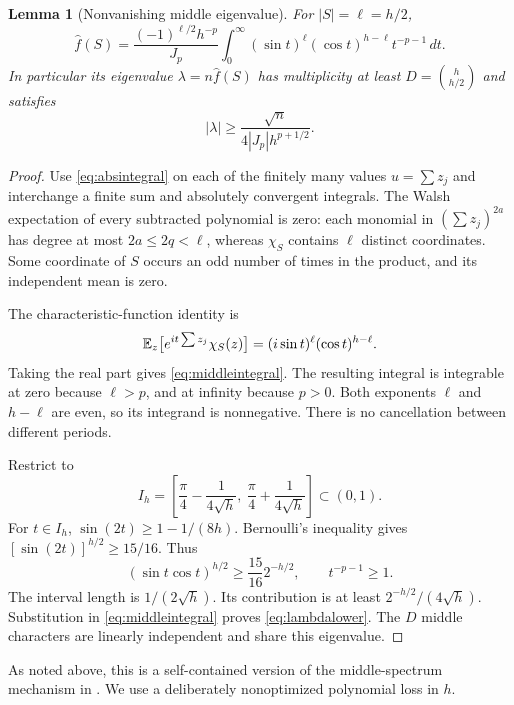 \documentclass[11pt]{article}
\newtheorem{lemma}[theorem]{Lemma}
\theoremstyle{remark}\newtheorem{remark}[theorem]{Remark}
\begin{document}
\begin{lemma}[Nonvanishing middle eigenvalue]\label{lem:middle}
For $|S|=\ell=h/2$,
\begin{equation}\label{eq:middleintegral}
 \widehat f(S)=\frac{(-1)^{\ell/2}h^{-p}}{J_p}
 \int_0^\infty(\sin t)^\ell(\cos t)^{h-\ell}t^{-p-1}\,dt.
\end{equation}
In particular its eigenvalue $\lambda=n\widehat f(S)$ has multiplicity at least
$D=\binom h{h/2}$ and satisfies
\begin{equation}\label{eq:lambdalower}
 |\lambda|\ge\frac{\sqrt n}{4|J_p|h^{p+1/2}}.
\end{equation}
\end{lemma}
\begin{proof}
Use \eqref{eq:absintegral} on each of the finitely many values $u=\sum z_j$ and interchange a finite sum and absolutely convergent integrals. The Walsh expectation of every subtracted polynomial is zero: each monomial in $(\sum z_j)^{2a}$ has degree at most $2a\le2q<\ell$, whereas $\chi_S$ contains $\ell$ distinct coordinates. Some coordinate of $S$ occurs an odd number of times in the product, and its independent mean is zero.

The characteristic-function identity is
\[
 \mathbb E_z\big[e^{it\sum z_j}\chi_S(z)\big]
 =(i\sin t)^{\ell}(\cos t)^{h-\ell}.
\]
Taking the real part gives \eqref{eq:middleintegral}. The resulting integral is integrable at zero because $\ell>p$, and at infinity because $p>0$. Both exponents $\ell$ and $h-\ell$ are even, so its integrand is nonnegative. There is no cancellation between different periods.

Restrict to
\[
 I_h=\left[\frac\pi4-\frac1{4\sqrt h},\ \frac\pi4+\frac1{4\sqrt h}\right]\subset(0,1).
\]
For $t\in I_h$, $\sin(2t)\ge1-1/(8h)$. Bernoulli's inequality gives
$[\sin(2t)]^{h/2}\ge15/16$. Thus
\[
 (\sin t\cos t)^{h/2}\ge\frac{15}{16}2^{-h/2},
 \qquad t^{-p-1}\ge1.
\]
The interval length is $1/(2\sqrt h)$. Its contribution is at least
$2^{-h/2}/(4\sqrt h)$. Substitution in \eqref{eq:middleintegral} proves \eqref{eq:lambdalower}. The $D$ middle characters are linearly independent and share this eigenvalue.
\end{proof}
As noted above, this is a self-contained version of the middle-spectrum mechanism in \cite{lww}. We use a deliberately nonoptimized polynomial loss in $h$.
\end{document}
